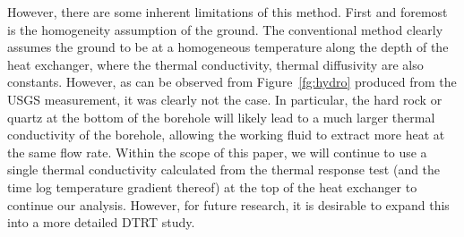 	However, there are some inherent limitations of this method. First and foremost is the homogeneity assumption of the ground. The conventional method clearly assumes the ground to be at a homogeneous temperature along the depth of the heat exchanger, where the thermal conductivity, thermal diffusivity are also constants. However, as can be observed from Figure~\ref{fg:hydro} produced from the USGS measurement, it was clearly not the case. In particular, the hard rock or quartz at the bottom of the borehole will likely lead to a much larger thermal conductivity of the borehole, allowing the working fluid to extract more heat at the same flow rate. Within the scope of this paper, we will continue to use a single thermal conductivity calculated from the thermal response test (and the time log temperature gradient thereof) at the top of the heat exchanger to continue our analysis. However, for future research, it is desirable to expand this into a more detailed DTRT study.
	
	